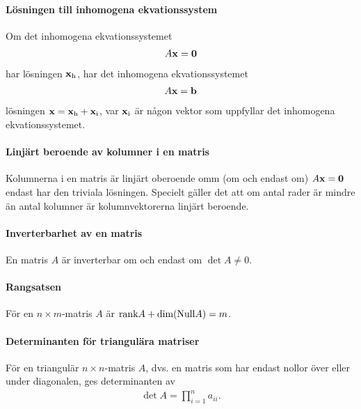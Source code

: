 \paragraph{Lösningen till inhomogena ekvationssystem}
Om det inhomogena ekvationssystemet
\begin{align*}
	A\vect{x} = \vect{0}
\end{align*}
har lösningen $\vect{x}_\text{h}$, har det inhomogena ekvationssystemet
\begin{align*}
	A\vect{x} = \vect{b}
\end{align*}
lösningen $\vect{x} = \vect{x}_\text{h} + \vect{x}_\text{i}$, var $\vect{x}_\text{i}$ är någon vektor som uppfyllar det inhomogena ekvationssystemet.

\proof


\paragraph{Linjärt beroende av kolumner i en matris}
Kolumnerna i en matris är linjärt oberoende omm (om och endast om) $A\vect{x} = \vect{0}$ endast har den triviala lösningen. Specielt gäller det att om antal rader är mindre än antal kolumner är kolumnvektorerna linjärt beroende.

\proof

\paragraph{Inverterbarhet av en matris}
En matris $A$ är inverterbar om och endast om $\det A\neq 0$.

\proof

\paragraph{Rangsatsen}
För en $n\times m$-matris $A$ är $\text{rank} A + \text{dim}(\text{Null} A) = m$.

\proof

\paragraph{Determinanten för triangulära matriser}
För en triangulär $n\times n$-matris $A$, dvs. en matris som har endast nollor över eller under diagonalen, ges determinanten av
\begin{align*}
	\det{A} = \prod\limits_{i = 1}^{n} a_{ii}.
\end{align*}

\proof

